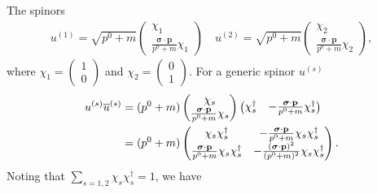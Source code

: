 The spinors
\begin{eqnarray}
    \label{eq:particle-spinors}
    u^{(1)} = \sqrt{p^{0} + m}
    \begin{pmatrix}
        \chi_1 \\ \frac{ \boldsymbol{\sigma} \cdot \mathbf{p} }{p^{0} + m} \chi_1
    \end{pmatrix} 
    \quad
    u^{(2)} = 
    \sqrt{p^{0} + m}
    \begin{pmatrix}
        \chi_2 \\ \frac{ \boldsymbol{\sigma} \cdot \mathbf{p} }{p^{0} + m} \chi_2
    \end{pmatrix} 
,\end{eqnarray}
where $\displaystyle \chi_1 = \begin{pmatrix} 1 \\ 0 \end{pmatrix}$ and $\displaystyle \chi_2 = \begin{pmatrix} 0 \\ 1 \end{pmatrix}$.
For a generic spinor $u^{(s)}$
\begin{align}
    \label{eq:completeness-work}
    u^{(s)} \overline{u}^{(s)} &= (p^{0} + m) 
    \begin{pmatrix}
        \chi_{s} \\ \frac{ \boldsymbol{\sigma} \cdot \mathbf{p} }{p^{0} + m} \chi_{s}
    \end{pmatrix}
    \begin{pmatrix}
        \chi_{s}^{\dagger} & -\frac{ \boldsymbol{\sigma} \cdot \mathbf{p} }{p^{0} + m} \chi_{s}^{\dagger}
    \end{pmatrix} \notag \\
                               &= (p^{0} + m) 
                               \begin{pmatrix}
                                   \chi_{s} \chi_{s}^{\dagger} & - \frac{ \boldsymbol{\sigma} \cdot \mathbf{p} }{p^{0} + m} \chi_{s} \chi_{s}^{\dagger} \\
                                   \frac{ \boldsymbol{\sigma} \cdot \mathbf{p} }{p^{0} + m} \chi_{s} \chi_{s}^{\dagger} & - \frac{ (\boldsymbol{\sigma} \cdot \mathbf{p})^2 }{(p^{0} + m)^2} \chi_{s} \chi_{s}^{\dagger}
                               \end{pmatrix} 
.\end{align}
Noting that $\sum_{s=1,2} \chi_{s}\chi_{s}^{\dagger} = 1$, we have

